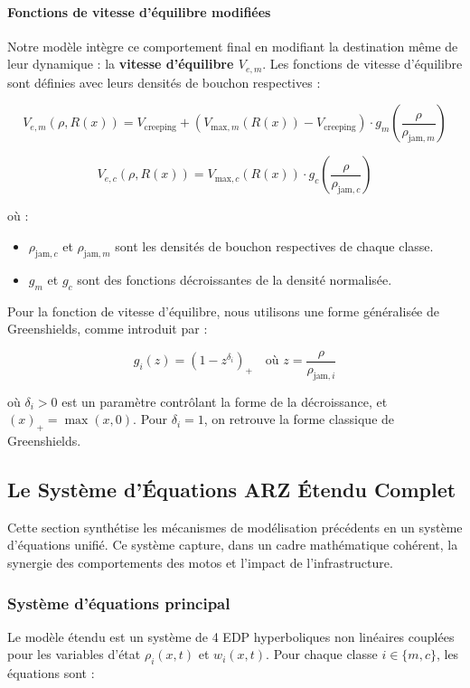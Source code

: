 \paragraph{Fonctions de vitesse d'équilibre modifiées}
Notre modèle intègre ce comportement final en modifiant la destination même de leur dynamique : la \textbf{vitesse d'équilibre $V_{e,m}$}. Les fonctions de vitesse d'équilibre sont définies avec leurs densités de bouchon respectives :

\begin{equation}
    V_{e,m}(\rho, R(x)) = V_{\text{creeping}} + \left(V_{\text{max},m}(R(x)) - V_{\text{creeping}}\right) \cdot g_m\left(\frac{\rho}{\rho_{\text{jam},m}}\right)
\end{equation}

\begin{equation}
    V_{e,c}(\rho, R(x)) = V_{\text{max},c}(R(x)) \cdot g_c\left(\frac{\rho}{\rho_{\text{jam},c}}\right)
\end{equation}

où :
\begin{itemize}
    \item $\rho_{\text{jam},c}$ et $\rho_{\text{jam},m}$ sont les densités de bouchon respectives de chaque classe.
    \item $g_m$ et $g_c$ sont des fonctions décroissantes de la densité normalisée.
\end{itemize}

Pour la fonction de vitesse d'équilibre, nous utilisons une forme généralisée de Greenshields, comme introduit par \cite{Greenshields1935} :

\begin{equation}
    g_i(z) = \left(1 - z^{\delta_i}\right)_+ \quad \text{où } z = \frac{\rho}{\rho_{\text{jam},i}}
\end{equation}

où $\delta_i > 0$ est un paramètre contrôlant la forme de la décroissance, et $(x)_+ = \max(x, 0)$. Pour $\delta_i = 1$, on retrouve la forme classique de Greenshields.
\subsection{Le Système d'Équations ARZ Étendu Complet}
Cette section synthétise les mécanismes de modélisation précédents en un système d'équations unifié. Ce système capture, dans un cadre mathématique cohérent, la synergie des comportements des motos et l'impact de l'infrastructure.

\subsubsection{Système d'équations principal}
Le modèle étendu est un système de 4 EDP hyperboliques non linéaires couplées pour les variables d'état $\rho_i(x, t)$ et $w_i(x, t)$. Pour chaque classe $i \in \{m, c\}$, les équations sont :

